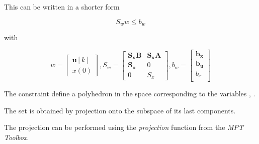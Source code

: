This can be written in a shorter form

\noindent
\begin{equation}
    S_w w \le b_w
\end{equation}

\noindent
with

\noindent
\begin{equation}
    w = 
    \left[ 
        \begin{matrix} 
            \mathbf{u}[k] \\ 
            x(0)
        \end{matrix}
    \right],
    S_w = 
    \left[
        \begin{matrix}
            \mathbf{S_x} \mathbf{B} & \mathbf{S_x} \mathbf{A} \\
            \mathbf{S_u} & 0 \\
            0 & S_x
        \end{matrix}
    \right],
    b_w = 
    \left[
        \begin{matrix}
            \mathbf{b_x} \\
            \mathbf{b_u} \\
            b_x \\
        \end{matrix}
    \right]
\end{equation}

The constraint  define a polyhedron  
in the space  corresponding to the variables , .

The set  is obtained by projection  onto the subspace of its last  components.

The projection can be performed using the \textit{projection} function from the \textit{MPT Toolbox}.
